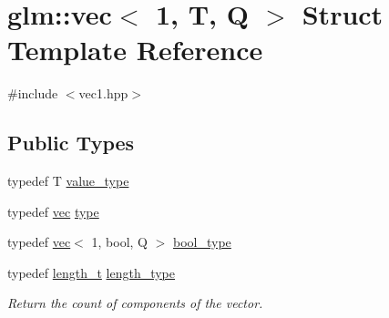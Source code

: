 \hypertarget{structglm_1_1vec_3_011_00_01_t_00_01_q_01_4}{}\section{glm\+:\+:vec$<$ 1, T, Q $>$ Struct Template Reference}
\label{structglm_1_1vec_3_011_00_01_t_00_01_q_01_4}


{\ttfamily \#include $<$vec1.\+hpp$>$}

\subsection*{Public Types}
\begin{DoxyCompactItemize}
\item 
typedef T \mbox{\hyperlink{structglm_1_1vec_3_011_00_01_t_00_01_q_01_4_a0d473625a844d6df09585a2a2eed637c}{value\+\_\+type}}
\item 
typedef \mbox{\hyperlink{structglm_1_1vec}{vec}} \mbox{\hyperlink{structglm_1_1vec_3_011_00_01_t_00_01_q_01_4_acc52e9f1fce6c99322df114842a855dd}{type}}
\item 
typedef \mbox{\hyperlink{structglm_1_1vec}{vec}}$<$ 1, bool, Q $>$ \mbox{\hyperlink{structglm_1_1vec_3_011_00_01_t_00_01_q_01_4_abf395a27aa73d1032bd2810013358668}{bool\+\_\+type}}
\item 
typedef \mbox{\hyperlink{namespaceglm_a090a0de2260835bee80e71a702492ed9}{length\+\_\+t}} \mbox{\hyperlink{structglm_1_1vec_3_011_00_01_t_00_01_q_01_4_a37415eee3b59cf93cdb752a2b30fe5e6}{length\+\_\+type}}
\begin{DoxyCompactList}\small\item\em Return the count of components of the vector. \end{DoxyCompactList}\end{DoxyCompactItemize}
